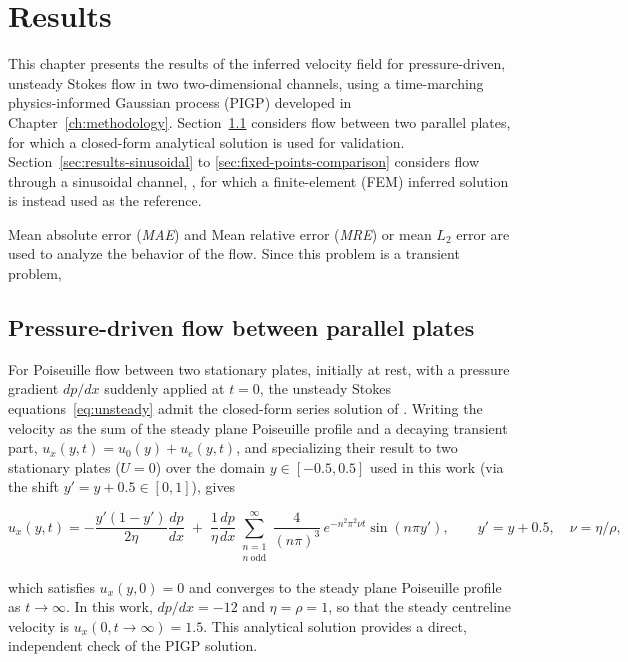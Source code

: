 \documentclass[11pt, a4paper]{report}
\begin{document}
\chapter{Results}%
\label{ch:results}

This chapter presents the results of the inferred velocity field for pressure-driven, unsteady Stokes
flow in two two-dimensional channels, using a time-marching physics-informed
Gaussian process (PIGP) developed in Chapter~\ref{ch:methodology}.
Section~\ref{sec:results-plates} considers flow between two parallel plates, for which
a closed-form analytical solution is used for validation.
Section~\ref{sec:results-sinusoidal} to \ref{sec:fixed-points-comparison} considers flow through a sinusoidal channel,
, for which a finite-element (FEM) inferred solution is instead used as the reference. 

Mean absolute error (\emph{MAE}) and Mean relative error (\emph{MRE}) or mean \(L_2\) error are used to analyze the behavior of the flow.
Since this problem is a transient problem, 


\section{Pressure-driven flow between parallel plates}%
\label{sec:results-plates}

For Poiseuille flow between two stationary plates, initially at rest, with a pressure
gradient \(dp/dx\) suddenly applied at \(t=0\), the unsteady Stokes
equations~\eqref{eq:unsteady} admit the closed-form series solution of
\textcite[Sec.~4.3]{Munoz2012}. Writing the velocity as the sum of the steady plane
Poiseuille profile and a decaying transient part, \(u_x(y,t) = u_0(y) + u_e(y,t)\), and
specializing their result to two stationary plates (\(U=0\)) over the domain
\(y\in[-0.5,0.5]\) used in this work (via the shift \(y'=y+0.5\in[0,1]\)), gives

\begin{equation}
    u_x(y,t) = -\frac{y'(1-y')}{2\eta}\frac{dp}{dx}
    \;+\; \frac{1}{\eta}\frac{dp}{dx}
    \sum_{\substack{n=1\\ n\ \mathrm{odd}}}^{\infty}
    \frac{4}{(n\pi)^3}\, e^{-n^2\pi^2 \nu t}\sin(n\pi y'),
    \qquad y' = y+0.5,\quad \nu = \eta/\rho,
    \label{eq:analytical-plates}
\end{equation}

\noindent which satisfies \(u_x(y,0)=0\) and converges to the steady plane Poiseuille
profile as \(t\to\infty\). In this work, \(dp/dx = -12\) and \(\eta=\rho=1\), so that the
steady centreline velocity is \(u_x(0,t\to\infty)=1.5\). This analytical solution
provides a direct, independent check of the PIGP solution.
\end{document}
